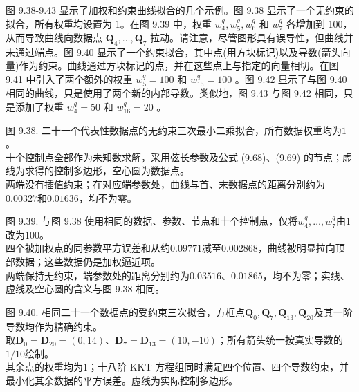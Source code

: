 \documentclass[../main.tex]{subfiles}
\begin{document}
图 9.38-9.43 显示了加权和约束曲线拟合的几个示例。图 9.38 显示了一个无约束的拟合，所有权重均设置为 1。在图 9.39 中，权重 \({w}_{4}^{q},{w}_{5}^{q},{w}_{6}^{q}\) 和 \({w}_{7}^{q}\) 各增加到 100，从而导致曲线向数据点 \({\mathbf{Q}}_{4},\ldots ,{\mathbf{Q}}_{7}\) 拉动。请注意，尽管图形具有误导性，但曲线并未通过端点。图 9.40 显示了一个约束拟合，其中点(用方块标记)以及导数(箭头向量)作为约束。曲线通过方块标记的点，并在这些点上与指定的向量相切。在图 9.41 中引入了两个额外的权重 \({w}_{5}^{q} = {100}\) 和 \({w}_{15}^{q} = {100}\) 。图 9.42 显示了与图 9.40 相同的曲线，只是使用了两个新的内部导数。类似地，图 9.43 与图 9.42 相同，只是添加了权重 \({w}_{4}^{q} = {50}\) 和 \({w}_{16}^{q} = {20}\) 。



\begin{center}
\begin{minipage}{27cm}
\vspace*{.6\baselineskip}
\centering
{}
\par\smallskip
图 9.38. 二十一个代表性数据点的无约束三次最小二乘拟合，所有数据权重均为$1$。\\
十个控制点全部作为未知数求解，采用弦长参数及公式 (9.68)、(9.69) 的节点；虚线为求得的控制多边形，空心圆为数据点。\\
两端没有插值约束；在对应端参数处，曲线与首、末数据点的距离分别约为$0.00327$和$0.01636$，均不为零。
\end{minipage}
\end{center}

\begin{center}
\begin{minipage}{27cm}
\vspace*{.6\baselineskip}
\centering
{}
\par\smallskip
图 9.39. 与图 9.38 使用相同的数据、参数、节点和十个控制点，仅将$w_4^q,\ldots,w_7^q$由$1$改为$100$。\\
四个被加权点的同参数平方误差和从约$0.09771$减至$0.002868$，曲线被明显拉向顶部数据；这些数据仍是加权逼近项。\\
两端保持无约束，端参数处的距离分别约为$0.03516$、$0.01865$，均不为零；实线、虚线及空心圆的含义与图 9.38 相同。
\end{minipage}
\end{center}

\begin{center}
\begin{minipage}{27cm}
\vspace*{.6\baselineskip}
\centering
{}
\par\smallskip
图 9.40. 相同二十一个数据点的受约束三次拟合，方框点$\mathbf Q_0,\mathbf Q_7,\mathbf Q_{13},\mathbf Q_{20}$及其一阶导数均作为精确约束。\\
取$\mathbf D_0=\mathbf D_{20}=(0,14)$、$\mathbf D_7=\mathbf D_{13}=(10,-10)$；所有箭头统一按真实导数的$1/10$绘制。\\
其余点的权重均为$1$；十八阶 KKT 方程组同时满足四个位置、四个导数约束，并最小化其余数据的平方误差。虚线为实际控制多边形。
\end{minipage}
\end{center}
\end{document}
